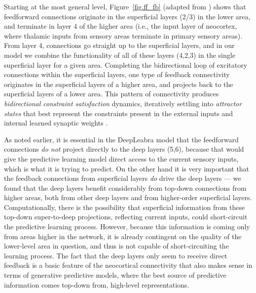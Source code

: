 \documentclass[11pt,twoside]{article}
\newif\myifpdf
\begin{document}
Starting at the most general level, Figure~\ref{fig.ff_fb} (adapted from ) shows that feedforward connections originate in the superficial layers (2/3) in the lower area, and terminate in layer 4 of the higher area (i.e., the input layer of neocortex, where thalamic inputs from sensory areas terminate in primary sensory areas).  From layer 4, connections go straight up to the superficial layers, and in our model we combine the functionality of all of these layers (4,2,3) in the single superficial layer for a given area.  Completing the bidirectional loop of excitatory connections within the superficial layers, one type of feedback connectivity originates in the superficial layers of a higher area, and projects back to the superficial layers of a lower area.  This pattern of connectivity produces {\em bidirectional constraint satisfaction} dynamics, iteratively settling into {\em attractor states} that best represent the constraints present in the external inputs and internal learned synaptic weights \cite{Hopfield82,Hopfield84,AckleyHintonSejnowski85,RumelhartMcClelland82}.

As noted earlier, it is essential in the DeepLeabra model that the feedforward connections {\em do not} project directly to the deep layers (5,6), because that would give the predictive learning model direct access to the current sensory inputs, which is what it is trying to predict. On the other hand it is very important that the feedback connections from superficial layers {\em do} drive the deep layers --- we found that the deep layers benefit considerably from top-down connections from higher areas, both from other deep layers and from higher-order superficial layers.  Computationally, there is the possibility that superficial information from these top-down super-to-deep projections, reflecting current inputs, could short-circuit the predictive learning process.  However, because this information is coming only from areas higher in the network, it is already contingent on the quality of the lower-level area in question, and thus is not capable of short-circuiting the learning process. The fact that the deep layers only seem to receive direct feedback is a basic feature of the neocortical connectivity that also makes sense in terms of generative predictive models, where the best source of predictive information comes top-down from, high-level representations.
\end{document}

